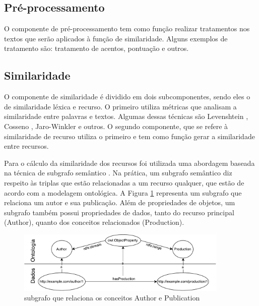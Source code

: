 \subsection{Pré-processamento}
O componente de pré-processamento tem como função realizar tratamentos nos textos que serão aplicados à função de similaridade. Alguns exemplos de tratamento são: tratamento de acentos, pontuação e outros.

\subsection{Similaridade}
O componente de similaridade é dividido em dois subcomponentes, sendo eles o de similaridade léxica e recurso. O primeiro utiliza métricas que analisam a similaridade entre palavras e textos. Algumas dessas técnicas são Levenshtein \cite{levenshtein1966binary}, Cosseno \cite{singhal2001modern}, Jaro-Winkler \cite{winkler1990string} e outros. O segundo componente, que se refere à similaridade de recurso utiliza o primeiro e tem como função gerar a similaridade entre recursos.

Para o cálculo da similaridade dos recursos foi utilizada uma abordagem baseada na técnica de subgrafo semântico \cite{wang2008lily}. Na prática, um subgrafo semântico diz respeito às triplas que estão relacionadas a um recurso qualquer, que estão de acordo com a modelagem ontológica. A Figura \ref{fig:subgrafo} representa um subgrafo que relaciona um autor e sua publicação. Além de propriedades de objetos, um subgrafo também possui propriedades de dados, tanto do recurso principal (Author), quanto dos conceitos relacionados (Production). %

\begin{figure}[!ht]
	\centering
	\includegraphics[width=0.9\textwidth]{./imagens/subgrafo_semantico.pdf}
    \caption{subgrafo que relaciona os conceitos Author e Publication}
	\label{fig:subgrafo}
\end{figure}


